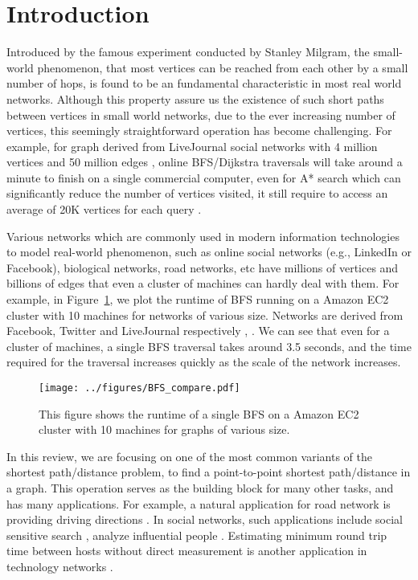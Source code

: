 \section{Introduction}
\label{intro}

Introduced by the famous experiment conducted by Stanley Milgram, the small-world phenomenon, that most vertices can be reached from each other by a small number of hops, is found to be an fundamental characteristic in most real world networks. Although this property assure us the existence of such short paths between vertices in small world networks, due to the ever increasing number of vertices, this seemingly straightforward operation has become challenging. 
For example, for graph derived from LiveJournal social networks with 4 million vertices and 50 million edges \cite{Backstrom:2006:GFL:1150402.1150412}, online BFS/Dijkstra traversals will take around a minute to finish on a single commercial computer, even for A* search which can significantly reduce the number of vertices visited, it still require to access an average of 20K vertices for each query \cite{Potamias:2009:FSP:1645953.1646063}. 

Various networks which are commonly used in modern information technologies to model real-world phenomenon, such as online social networks (e.g., LinkedIn or Facebook), biological networks, road networks, etc have millions of vertices and billions of edges that even a cluster of machines can hardly deal with them. 
For example, in Figure~\ref{fig:trend}, we plot the runtime of BFS running on a Amazon EC2 cluster with 10 machines for networks of various size. Networks are derived from Facebook, Twitter and LiveJournal respectively \cite{Mcauley:2014:DSC:2582178.2556612}, \cite{Backstrom:2006:GFL:1150402.1150412}. We can see that even for a cluster of machines, a single BFS traversal takes around 3.5 seconds, and the time required for the traversal increases quickly as the scale of the network increases.

\begin{figure}[t]
    \centering
    \texttt{[image: ../figures/BFS\_compare.pdf]}
    \caption{This figure shows the runtime of a single BFS on a Amazon EC2 cluster with 10 machines for graphs of various size.}
    \label{fig:trend}
\end{figure}

In this review, we are focusing on one of the most common variants of the shortest path/distance problem, to find a point-to-point shortest path/distance in a graph. This operation serves as the building block for many other tasks, and has many applications. For example, a natural application for road network is providing driving directions \cite{Abraham:2011:HLA:2008623.2008645}. In social networks, such applications include social sensitive search \cite{Vieira:2007:ESR:1321440.1321520}, analyze influential people \cite{Kempe:2003:MSI:956750.956769}. Estimating minimum round trip time between hosts without direct measurement is another application in technology networks \cite{Tang:2003:VLI:948205.948223}.

